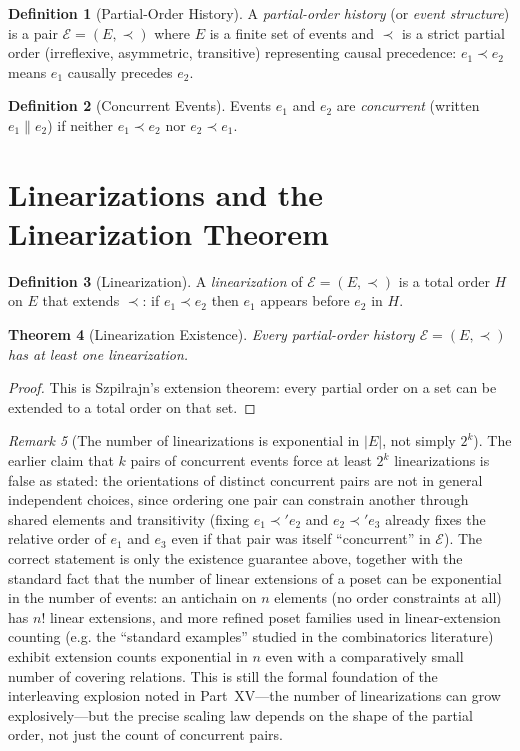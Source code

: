 \documentclass[12pt, a4paper, openany]{book}
\theoremstyle{plain}
\newtheorem{theorem}{Theorem}[chapter]
\theoremstyle{definition}
\newtheorem{definition}[theorem]{Definition}
\theoremstyle{remark}
\newtheorem{remark}[theorem]{Remark}
\begin{document}
\begin{definition}[Partial-Order History]
A \emph{partial-order history} (or \emph{event structure}) is a pair
$\mathcal{E} = (E, \prec)$ where $E$ is a finite set of events and $\prec$
is a strict partial order (irreflexive, asymmetric, transitive) representing
causal precedence: $e_1 \prec e_2$ means $e_1$ causally precedes $e_2$.
\end{definition}

\begin{definition}[Concurrent Events]
Events $e_1$ and $e_2$ are \emph{concurrent} (written $e_1 \parallel e_2$) if
neither $e_1 \prec e_2$ nor $e_2 \prec e_1$.
\end{definition}

\section{Linearizations and the Linearization Theorem}

\begin{definition}[Linearization]
A \emph{linearization} of $\mathcal{E} = (E, \prec)$ is a total order $H$ on
$E$ that extends $\prec$: if $e_1 \prec e_2$ then $e_1$ appears before $e_2$
in $H$.
\end{definition}

\begin{theorem}[Linearization Existence]
Every partial-order history $\mathcal{E} = (E, \prec)$ has at least one
linearization.
\end{theorem}

\begin{proof}
This is Szpilrajn's extension theorem: every partial order on a set can be
extended to a total order on that set.
\end{proof}

\begin{remark}[The number of linearizations is exponential in $|E|$, not simply $2^k$]
The earlier claim that $k$ pairs of concurrent events force at least $2^k$
linearizations is false as stated: the orientations of distinct concurrent
pairs are not in general independent choices, since ordering one pair can
constrain another through shared elements and transitivity (fixing
$e_1 \prec' e_2$ and $e_2 \prec' e_3$ already fixes the relative order of
$e_1$ and $e_3$ even if that pair was itself ``concurrent'' in $\mathcal{E}$).
The correct statement is only the existence guarantee above, together with the
standard fact that the number of linear extensions of a poset can be
exponential in the number of events: an antichain on $n$ elements (no order
constraints at all) has $n!$ linear extensions, and more refined poset
families used in linear-extension counting (e.g. the ``standard examples''
studied in the combinatorics literature) exhibit extension counts exponential
in $n$ even with a comparatively small number of covering relations. This is
still the formal foundation of the interleaving explosion noted in Part~XV---the
number of linearizations can grow explosively---but the precise scaling law
depends on the shape of the partial order, not just the count of concurrent
pairs.
\end{remark}
\end{document}
